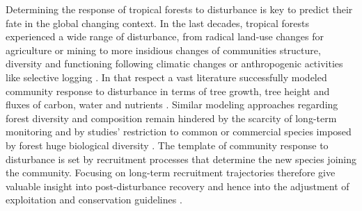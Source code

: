 \documentclass[
  11pt,
  french,
  A4paper,
  extrafontsizes,onecolumn,openright
  ]{memoir}
\begin{document}
Determining the response of tropical forests to disturbance is key to
predict their fate in the global changing context. In the last decades,
tropical forests experienced a wide range of disturbance, from radical
land-use changes for agriculture or mining
\autocites{Dezecache2017a}{Dezecache2017b} to more insidious changes of
communities structure, diversity and functioning following climatic
changes \autocite{Aubry-Kientz2015} or anthropogenic activities like
selective logging \autocite{Baraloto2012a}. In that respect a vast
literature successfully modeled community response to disturbance in
terms of tree growth, tree height and fluxes of carbon, water and
nutrients
\autocites{Gourlet-Fleury2000}{Putz2012}{Piponiot2016}{Rutishauser2016}.
Similar modeling approaches regarding forest diversity and composition
remain hindered by the scarcity of long-term monitoring and by studies'
restriction to common or commercial species imposed by forest huge
biological diversity \autocites{Sebbenn2008}{Vinson2015}. The template
of community response to disturbance is set by recruitment processes
that determine the new species joining the community. Focusing on
long-term recruitment trajectories therefore give valuable insight into
post-disturbance recovery and hence into the adjustment of exploitation
and conservation guidelines \autocites{Diaz2005}{Schwartz2017}.
\end{document}
